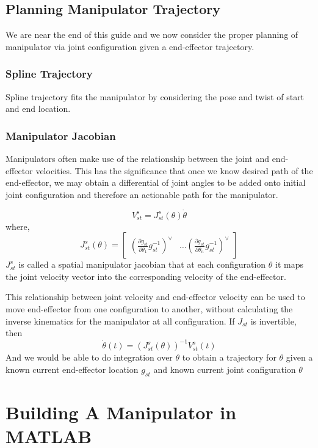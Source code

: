 \documentclass[letterpaper]{article}
\begin{document}
\fi

\subsection{Planning Manipulator Trajectory}
We are near the end of this guide and we now consider the proper planning of manipulator
via joint configuration given a end-effector trajectory.
\subsubsection{Spline Trajectory}
Spline trajectory fits the manipulator by considering the pose and twist of start
and end location. 

\subsubsection{Manipulator Jacobian}
Manipulators often make use of the relationship between the joint and end-effector
velocities. This has the significance that once we know desired path of the 
end-effector, we may obtain a differential of joint angles to be added onto
initial joint configuration and therefore an actionable path for the manipulator.

\begin{equation*}
  V^{s}_{st} = J^{s}_{st}(\theta)\dot{\theta}
\end{equation*}
where,
\begin{equation*}
  J^s_{st}(\theta) = \begin{bmatrix}
    \left(\frac{\partial g_{st}}{\partial \theta_1}g^{-1}_{st}\right)^\vee & \dots
    \left(\frac{\partial g_{st}}{\partial \theta_n}g^{-1}_{st}\right)^\vee
  \end{bmatrix}
\end{equation*}
$J^s_{st}$ is called a spatial manipulator jacobian that at each configuration $\theta$
it maps the joint velocity vector into the corresponding velocity of the
end-effector. 

This relationship between joint velocity and end-effector velocity can be used
to move end-effector from one configuration to another, without calculating the
inverse kinematics for the manipulator at all configuration. If $J_{st}$ is invertible,
then
\begin{equation*}
  \dot{\theta}(t) = \left(J^{s}_{st}(\theta)\right)^{-1}V^{s}_{st}(t)
\end{equation*}
And we would be able to do integration over $\theta$ to obtain a trajectory for 
$\theta$ given a known current end-effector location $g_{st}$ and known
current joint configuration $\theta$

\section{Building A Manipulator in MATLAB}
\end{document}
